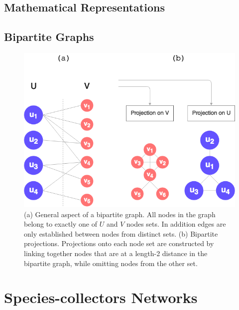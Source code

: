 \subsection{Mathematical Representations}





\subsection{Bipartite Graphs}

  \begin{figure}[h!]
  	\centering
    \includegraphics[width=0.5\linewidth]{figures/bipartite_general.png}
    \caption{(a) General aspect of a bipartite graph. All nodes in the graph belong to exactly one of $U$ and $V$ nodes sets. In addition edges are only established between nodes from distinct sets. (b) Bipartite projections. Projections onto each node set are constructed by linking together nodes that are at a length-2 distance in the bipartite graph, while omitting nodes from the other set.}
    \label{fig:bipartite_general}
  \end{figure}


\section{Species-collectors Networks}

